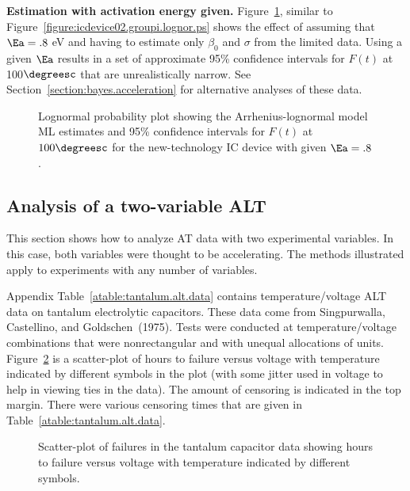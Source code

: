 \begin{example}
\label{example:new.tech.ic.beta.known}
{\bf Estimation with activation energy given.}
Figure~\ref{figure:icdevice02.groupm.lognor.fixedea.ps}, similar to
Figure~\ref{figure:icdevice02.groupi.lognor.ps} shows the effect of
assuming that $\Ea=.8$ eV and having to estimate only $\beta_{0}$
and $\sigma$ from the limited data. Using a given $\Ea$ results in a
set of approximate 95\% confidence intervals for $F(t)$ at
100$\degreesc$ that are unrealistically narrow. See
Section~\ref{section:bayes.acceleration} for alternative analyses of
these data.
\end{example}
\begin{figure}
\caption{Lognormal probability plot showing the Arrhenius-lognormal model ML 
estimates and 95\% confidence intervals for $F(t)$ at $100\degreesc$ for the 
new-technology IC device with given 
$\Ea=.8$.}
\label{figure:icdevice02.groupm.lognor.fixedea.ps}
\end{figure}

\subsection{Analysis of a two-variable ALT}
\label{section:two.factor.alt}
This section shows how to analyze AT data with two 
experimental variables. In this case, both variables
were thought to be accelerating. The methods
illustrated apply to experiments with any number of variables.

Appendix Table~\ref{atable:tantalum.alt.data} contains
temperature/voltage ALT data on tantalum electrolytic capacitors.
These data come from Singpurwalla, Castellino, and Goldschen~(1975).
Tests were conducted at temperature/voltage combinations that were
nonrectangular and with unequal allocations of units.
Figure~\ref{figure:tantalum.scatter.ps} is a scatter-plot of hours
to failure versus voltage with temperature indicated by different
symbols in the plot (with some jitter used in voltage to help in
viewing ties in the data).  The amount of censoring is indicated in
the top margin.  There were various censoring times that are given
in Table~\ref{atable:tantalum.alt.data}.
\begin{figure}
\caption{Scatter-plot of failures in the tantalum capacitor data
showing hours to failure versus voltage with temperature indicated by
different symbols.}
\label{figure:tantalum.scatter.ps}
\end{figure}

